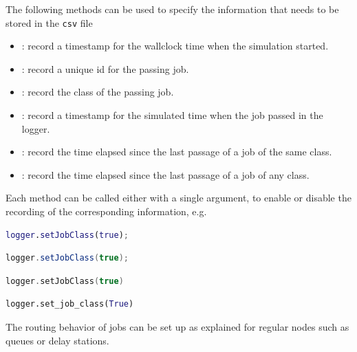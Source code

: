 The following methods can be used to specify the information that needs to be stored in the \texttt{csv} file
\begin{itemize}
\item {}: record a timestamp for the wallclock time when the simulation started.
\item {}: record a unique id for the passing job.
\item {}: record the class of the passing job.
\item {}: record a timestamp for the simulated time when the job passed in the logger.
\item {}: record the time elapsed since the last passage of a job of the same class.
\item {}: record the time elapsed since the last passage of a job of any class.
\end{itemize}
Each method can be called either with a single  argument, to enable or disable the recording of the corresponding information, e.g.
\begin{MATLAB}
\begin{lstlisting}[language = matlab]
logger.setJobClass(true);
\end{lstlisting}
\end{MATLAB}
\begin{JAVA}
\begin{lstlisting}[language=java, basicstyle=\ttfamily\scriptsize]
logger.setJobClass(true);
\end{lstlisting}
\end{JAVA}
\begin{KOTLIN}
\begin{lstlisting}[language=kotlin, basicstyle=\ttfamily\scriptsize]
logger.setJobClass(true)
\end{lstlisting}
\end{KOTLIN}
\begin{PYTHON}
\begin{lstlisting}[language=python]
logger.set_job_class(True)
\end{lstlisting}
\end{PYTHON}
The routing behavior of jobs can be set up as explained for regular nodes such as queues or delay stations.

